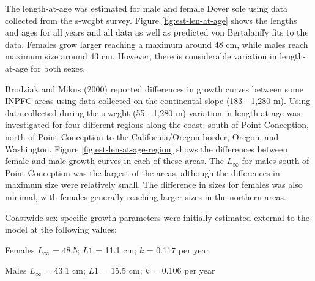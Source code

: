 \documentclass[11pt,
  english,
  a4paper,
]{article}
\begin{document}

The length-at-age was estimated for male and female Dover sole using data collected from the \gls{s-wcgbt} survey. Figure \ref{fig:est-len-at-age} shows the lengths and ages for all years and all data as well as predicted von Bertalanffy fits to the data. Females grow larger reaching a maximum around 48 cm, while males reach maximum size around 43 cm. However, there is considerable variation in length-at-age for both sexes.

\leavevmode\tagmcend\tagstructend\par


Brodziak and Mikus {(2000)\leavevmode\tagmcend\tagstructend} reported differences in growth curves between some INPFC areas using data collected on the continental slope (183 - 1,280 m). Using data collected during the \gls{s-wcgbt} (55 - 1,280 m) variation in length-at-age was investigated for four different regions along the coast: south of Point Conception, north of Point Conception to the California/Oregon border, Oregon, and Washington. Figure \ref{fig:est-len-at-age-region} shows the differences between female and male growth curves in each of these areas. The {\(L_{\infty}\)\leavevmode\tagmcend\tagstructend} for males south of Point Conception was the largest of the areas, although the differences in maximum size were relatively small. The difference in sizes for females was also minimal, with females generally reaching larger sizes in the northern areas.

\leavevmode\tagmcend\tagstructend\par


Coastwide sex-specific growth parameters were initially estimated external to the model at the following values:

\leavevmode\tagmcend\tagstructend\par

\begin{centering}

Females $L_{\infty}$ = 48.5; $L1$ = 11.1 cm; $k$ = 0.117 per year

Males $L_{\infty}$ = 43.1 cm; $L1$ = 15.5 cm; $k$ = 0.106 per year

\end{centering}
\end{document}
